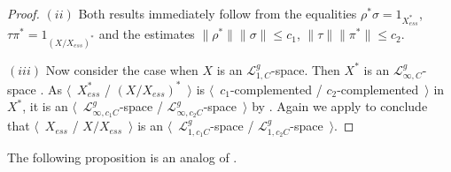 \begin{proof}
$(ii)$ Both results immediately follow from the equalities
$\rho^*\sigma=1_{X_{ess}^*}$, $\tau \pi^*=1_{{(X/X_{ess})}^*}$ and the estimates
$\lVert \rho^*\rVert\lVert \sigma\rVert\leq c_1$, 
$\lVert\tau\rVert\lVert \pi^*\rVert\leq c_2$.

$(iii)$ Now consider the case when $X$ is an $\mathscr{L}_{1,C}^g$-space. Then $X^*$
is an $\mathscr{L}_{\infty,C}^g$-space \cite[corollary 23.2.1(1)]{DefFloTensNorOpId}. As $\langle$~$X_{ess}^*$ / ${(X/X_{ess})}^*$~$\rangle$ is
$\langle$~$c_1$-complemented / $c_2$-complemented~$\rangle$ in $X^*$, it is an
$\langle$~$\mathscr{L}_{\infty,c_1C}^g$-space /
$\mathscr{L}_{\infty,c_2C}^g$-space~$\rangle$ by \cite[corollary 23.2.1(1)]{DefFloTensNorOpId}. Again we apply \cite[corollary 23.2.1(1)]{DefFloTensNorOpId} to conclude that $\langle$~$X_{ess}$  / $X/X_{ess}$~$\rangle$ is an
$\langle$~$\mathscr{L}_{1,c_1C}^g$-space /
$\mathscr{L}_{1,c_2C}^g$-space~$\rangle$.
\end{proof}

The following proposition is an analog 
of \cite[proposition 2.1.11]{RamsHomPropSemgroupAlg}.

